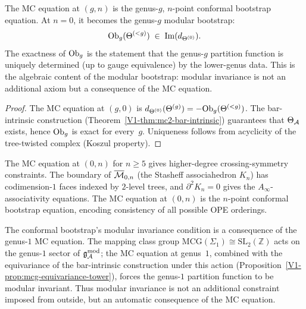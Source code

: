 \begin{corollary}
The MC equation at $(g, n)$ is the genus-$g$, $n$-point
conformal bootstrap equation. At $n = 0$, it becomes the
genus-$g$ modular bootstrap:
\begin{equation}%
\Ob_g(\Theta^{(<g)}) \;\in\; \mathrm{Im}(d_{\Theta^{(0)}}).
\end{equation}
The exactness of $\mathrm{Ob}_g$ is the statement that the genus-$g$
partition function is uniquely determined \textup{(}up to gauge
equivalence\textup{)} by the lower-genus data. This is the
algebraic content of the modular bootstrap: modular invariance
is not an additional axiom but a consequence of the MC equation.
\end{corollary}

\begin{proof}
The MC equation at $(g, 0)$ is
$d_{\Theta^{(0)}}(\Theta^{(g)}) = -\mathrm{Ob}_g(\Theta^{(<g)})$.
The bar-intrinsic construction
(Theorem~\ref*{V1-thm:mc2-bar-intrinsic}) guarantees that
$\Theta_{\mathcal{A}}$ exists, hence $\mathrm{Ob}_g$ is exact for
every~$g$. Uniqueness follows from acyclicity of the
tree-twisted complex (Koszul property).
\end{proof}

\begin{remark}
The MC equation at $(0, n)$ for $n \geq 5$ gives higher-degree
crossing-symmetry constraints. The boundary of
$\overline{\mathcal{M}}_{0,n}$ (the Stasheff associahedron $K_n$) has
codimension-$1$ faces indexed by $2$-level trees, and
$\partial^2 K_n = 0$ gives the $A_\infty$-associativity
equations. The MC equation at $(0, n)$ is the $n$-point
conformal bootstrap equation, encoding consistency of all
possible OPE orderings.
\end{remark}

\begin{remark}
The conformal bootstrap's modular invariance condition is
a consequence of the genus-$1$ MC equation. The mapping class
group $\mathrm{MCG}(\Sigma_1) \cong \mathrm{SL}_2(\mathbb{Z})$
acts on the genus-$1$ sector of $\mathfrak{g}_{\mathcal{A}}^{\mathrm{mod}}$; the MC equation at
genus~$1$, combined with the equivariance of the bar-intrinsic
construction under this action
(Proposition~\ref{V1-prop:mcg-equivariance-tower}), forces the
genus-$1$ partition function to be modular invariant.
Thus modular invariance is not an additional constraint
imposed from outside, but an automatic consequence of the
MC equation.
\end{remark}

